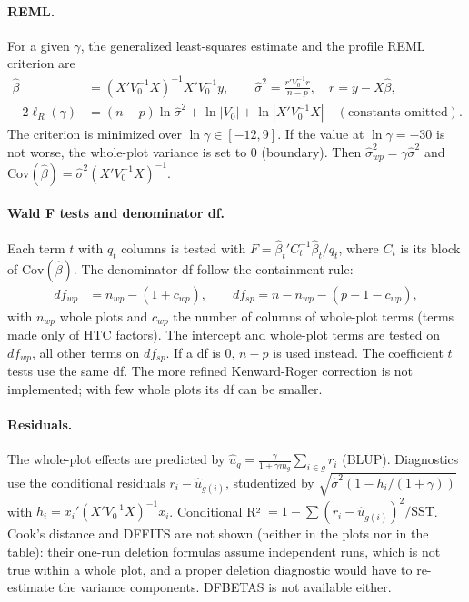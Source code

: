 \paragraph{REML.} For a given $\gamma$, the generalized least-squares estimate and the profile REML criterion
are
\begin{align}
  \hat\beta&=(X'V_0^{-1}X)^{-1}X'V_0^{-1}y,\qquad
  \hat\sigma^2=\frac{r'V_0^{-1}r}{n-p},\quad r=y-X\hat\beta, \label{eq:ch05-gls}\\
  -2\ell_R(\gamma)&=(n-p)\ln\hat\sigma^2+\ln|V_0|+\ln|X'V_0^{-1}X| \quad(\text{constants omitted}).
  \label{eq:ch05-reml}
\end{align}
The criterion is minimized over $\ln\gamma\in[-12,9]$. If the value at $\ln\gamma=-30$ is not worse, the
whole-plot variance is set to 0 (boundary). Then $\hat\sigma^2_{wp}=\gamma\hat\sigma^2$ and
$\text{Cov}(\hat\beta)=\hat\sigma^2(X'V_0^{-1}X)^{-1}$.

\paragraph{Wald F tests and denominator df.} Each term $t$ with $q_t$ columns is tested with
$F=\hat\beta_t'C_t^{-1}\hat\beta_t/q_t$, where $C_t$ is its block of $\text{Cov}(\hat\beta)$. The denominator
df follow the containment rule:
\begin{align}
  df_{wp}&=n_{wp}-(1+c_{wp}),\qquad df_{sp}=n-n_{wp}-(p-1-c_{wp}), \label{eq:ch05-dfcont}
\end{align}
with $n_{wp}$ whole plots and $c_{wp}$ the number of columns of whole-plot terms (terms made only of HTC
factors). The intercept and whole-plot terms are tested on $df_{wp}$, all other terms on $df_{sp}$. If a df
is 0, $n-p$ is used instead. The coefficient $t$ tests use the same df. The more refined Kenward-Roger
correction \citep{kenward1997} is not implemented; with few whole plots its df can be smaller.

\paragraph{Residuals.} The whole-plot effects are predicted by
$\hat u_g=\frac{\gamma}{1+\gamma m_g}\sum_{i\in g}r_i$ (BLUP). Diagnostics use the conditional residuals
$r_i-\hat u_{g(i)}$, studentized by $\sqrt{\hat\sigma^2(1-h_i/(1+\gamma))}$ with
$h_i=x_i'(X'V_0^{-1}X)^{-1}x_i$. Conditional R² $=1-\sum(r_i-\hat u_{g(i)})^2/\text{SST}$. Cook's distance and
DFFITS are not shown (neither in the plots nor in the table): their one-run deletion formulas assume
independent runs, which is not true within a whole plot, and a proper deletion diagnostic would have to
re-estimate the variance components. DFBETAS is not available either.


